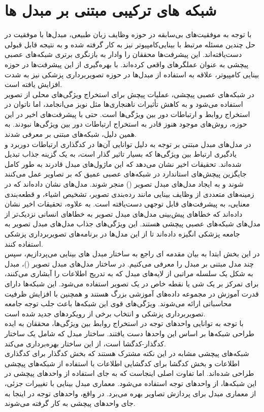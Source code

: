\section{شبکه های ترکیبی مبتنی بر مبدل ها}
با توجه به موفقیت‌های بی‌سابقه در حوزه وظایف زبان طبیعی، مبدل‌ها با موفقیت در حل چندین مسئله مرتبط با بینایی‌کامپیوتر نیز به کار گرفته شده و به نتیجه قابل قبولی دست‌یافته‌اند. این پیشرفت‌ها محققان را وادار به بازنگری برتری شبکه‌های عصبی پیچشی به عنوان عملگرهای واقعی کرده‌اند. با بهره‌گیری از این پیشرفت‌ها در حوزه بینایی کامپیوتر، علاقه به استفاده از مبدل‌ها در حوزه تصویربرداری پزشکی نیز به شدت افزایش یافته است.
\\
در شبکه‌های عصبی پیچشی، عملیات پیچش برای استخراج ویژگی‌های محلی از تصویر استفاده می‌شود و به کاهش تأثیرات ناهنجاری‌ها مثل نویز می‌انجامد، اما ناتوان در استخراج روابط و ارتباطات دور بین ویژگی‌ها است. حتی با پیشرفت‌های اخیر در این حوزه، روش‌های موجود هنوز قادر به استخراج ارتباطات دور بین ویژگی‌ها نبودند. به همین دلیل، شبکه‌های مبتنی بر  معرفی شدند.
\\
در مدل‌های مبدل مبتنی بر توجه به دلیل توانایی آن‌ها در کدگذاری ارتباطات دوربرد و یادگیری ارتباط بین ویژگی‌ها که بسیار تاثیر گذار است، به یک گزینه جذاب تبدیل شده‌اند. تحقیقات اخیر نشان می‌دهد که این ماژول‌های مبدل قادرند به طور کامل جایگزین پیچش‌های استاندارد در شبکه‌های عصبی عمیق که بر تصاویر عمل می‌کنند شوند و به ایجاد مدل‌های مبدل تصویر () منجر شوند. مدل‌های  نشان داده‌اند که در زمینه‌های متعددی از وظایف بینایی مانند رده‌بندی تصویر، تشخیص اشیاء، و قطعه‌بندی معنایی، به پیشرفت‌های قابل توجهی دست‌یافته است. به علاوه، تحقیقات اخیر نشان داده‌اند که خطاهای پیش‌بینی مدل‌های مبدل تصویر به خطاهای انسانی نزدیک‌تر از مدل‌های شبکه‌های عصبی پیچشی هستند. این ویژگی‌های جذاب مدل‌های مبدل تصویر به جامعه پزشکی انگیزه داده‌اند تا از این مدل‌ها در برنامه‌های تصویربرداری پزشکی استفاده کنند.
\\
در این بخش ابتدا به بیان مقدمه ای راجع به ساختار مبدل های بینایی می‌پردازیم، سپس چند مدل مبتنی بر مبدل را معرفی می‌کنیم.
در ساختار مدل‌های مبدل تصویر ()، مبدل به شکل یک سلسله مراتبی از لایه‌های مبدل که به تدریج اطلاعات را آبشاری می‌کنند، برای تمرکز بر یک شی یا نقطه خاص در یک تصویر استفاده می‌شود. این شبکه‌ها دارای قدرت آموزش در مجموعه داده‌های آموزشی بزرگ هستند و همچنین با افزایش ظرفیت محاسباتی ارائه می‌شوند. ویژگی‌های قوی این شبکه‌ها باعث جلب توجه جامعه تصویربرداری پزشکی و انتخاب برخی از رویکردهای جدید شده است.
\\
با توجه به توانایی واحدهای توجه در استخراج روابط بین ویژگی‌ها، محققان به ایده طراحی شبکه‌ها بر اساس این واحدها دست یافتند. ساختار مبدل که شامل یک ساختار کدگذار-کدگشا است، از این ساختار بهره‌برداری می‌کند.
\\
شبکه‌های پیچشی مشابه  در این نکته مشترک هستند که بخش کدگذار برای کدگذاری اطلاعات و بخش کدگشا برای کدگشایی اطلاعات با استفاده از شبکه‌های پیچشی طراحی شده‌اند. اما تفاوت اصلی اینجاست که به جای استفاده از واحدهای پیچشی در این شبکه‌ها، از واحدهای توجه استفاده می‌شود. معماری مبدل بینایی با تغییرات جزئی، از معماری مبدل برای پردازش تصاویر بهره می‌برد. در واقع، واحدهای توجه در اینجا به جای واحدهای پیچشی به کار گرفته می‌شوند.

